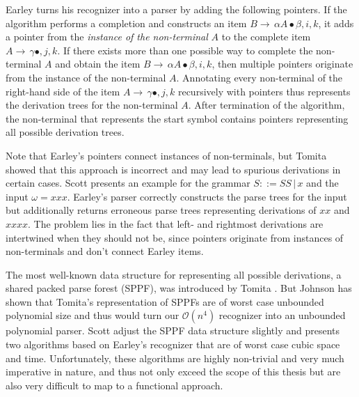 \begin{isabellebody}
\begin{isamarkuptext}
Earley \cite{Earley:1970} turns his recognizer into a parser by adding the following
pointers. If the algorithm performs a completion and constructs an item $B \rightarrow \, \alpha A \bullet \beta, i, k$,
it adds a pointer from the \textit{instance of the non-terminal} $A$ to the complete item
$A \rightarrow \, \gamma \bullet, j, k$. If there exists more than one possible way to complete the non-terminal
$A$ and obtain the item $B \rightarrow \, \alpha A \bullet \beta, i, k$, then multiple pointers originate
from the instance of the non-terminal $A$. Annotating every non-terminal of the right-hand side of the item
$A \rightarrow \, \gamma \bullet, j, k$ recursively with pointers thus represents the derivation trees for
the non-terminal $A$. After termination of the algorithm, the non-terminal that represents the start symbol
contains pointers representing all possible derivation trees.

Note that Earley's pointers connect instances of non-terminals, but Tomita \cite{Tomita:1985} showed
that this approach is incorrect and may lead to spurious derivations in certain cases. Scott \cite{Scott:2008}
presents an example for the grammar $S ::= SS \, | \, x$ and the input $\omega = xxx$. Earley's parser
correctly constructs the parse trees for the input but additionally returns erroneous parse trees representing
derivations of $xx$ and $xxxx$. The problem lies in the fact that left- and rightmost derivations are
intertwined when they should not be, since pointers originate from instances of non-terminals and don't
connect Earley items.

The most well-known data structure for representing all possible derivations, a shared packed parse
forest (SPPF), was introduced by Tomita \cite{Tomita:1985}. But Johnson \cite{Johnson:1991} has
shown that Tomita's representation of SPPFs are of worst case unbounded polynomial size and thus
would turn our $\mathcal{O}(n^4)$ recognizer into an unbounded polynomial parser. Scott \cite{Scott:2008}
adjust the SPPF data structure slightly and presents two algorithms based on Earley's recognizer that
are of worst case cubic space and time. Unfortunately, these algorithms are highly non-trivial and
very much imperative in nature, and thus not only exceed the scope of this thesis but are also
very difficult to map to a functional approach.


\end{isamarkuptext}
\end{isabellebody}
